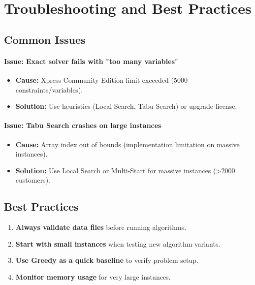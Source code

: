 \documentclass[11pt,a4paper]{article}
\begin{document}
\section{Troubleshooting and Best Practices}

\subsection{Common Issues}

\paragraph{Issue: Exact solver fails with "too many variables"}
\begin{itemize}
  \item \textbf{Cause:} Xpress Community Edition limit exceeded (5000 constraints/variables).
  \item \textbf{Solution:} Use heuristics (Local Search, Tabu Search) or upgrade license.
\end{itemize}

\paragraph{Issue: Tabu Search crashes on large instances}
\begin{itemize}
  \item \textbf{Cause:} Array index out of bounds (implementation limitation on massive instances).
  \item \textbf{Solution:} Use Local Search or Multi-Start for massive instances (>2000 customers).
\end{itemize}

\subsection{Best Practices}
\begin{enumerate}
  \item \textbf{Always validate data files} before running algorithms.
  \item \textbf{Start with small instances} when testing new algorithm variants.
  \item \textbf{Use Greedy as a quick baseline} to verify problem setup.
  \item \textbf{Monitor memory usage} for very large instances.
\end{enumerate}
\end{document}
